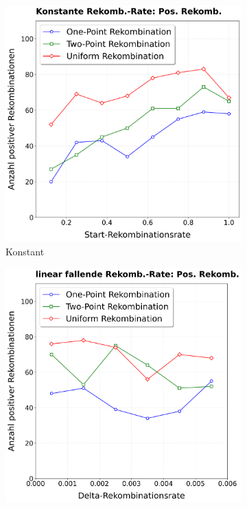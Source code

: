 \begin{figure}[H]
	\centering
	\begin{subfigure}[b]{0.32\textwidth}
		\includegraphics[width=\textwidth]{Bilder/EncodePlotPositiveRekombinationKonstant.png}
		\caption{Konstant}
		\label{fig:encodePosRekombinationKonstant}
	\end{subfigure}%
	\hfill
	\begin{subfigure}[b]{0.32\textwidth}
		\includegraphics[width=\textwidth]{Bilder/EncodePlotPositiveRekombinationClegg.png}

\end{subfigure}
\end{figure}
